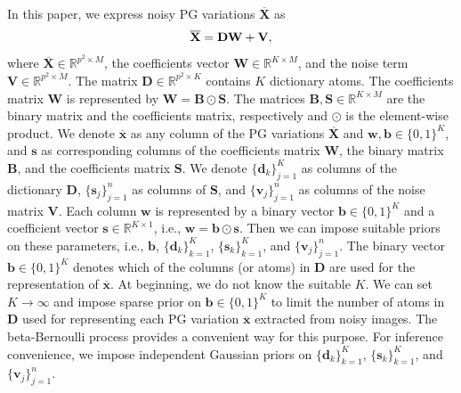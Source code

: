 \documentclass[runningheads]{llncs}
\begin{document}
In this paper, we express noisy PG variations $\mathbf{\overline{X}}$ as\vspace{-0.1in}
\begin{equation}\label{equ7}
\mathbf{\overline{X}} = \mathbf{D}\mathbf{W}+\mathbf{V},\vspace{-0.1in}
\end{equation}
where $\mathbf{\overline{X}}\in\mathbb{R}^{p^2\times M}$, the coefficients vector 
$\mathbf{W}\in\mathbb{R}^{K\times M}$, and the noise term $\mathbf{V} \in \mathbb{R}^{p^2\times M}$. The matrix $\mathbf{D}\in \mathbb{R}^{p^2\times K}$ contains $K$ dictionary atoms. The coefficients matrix $\mathbf{W}$ is represented by $\mathbf{W} = \mathbf{B}\odot\mathbf{S}$. The matrices $\mathbf{B}, \mathbf{S}\in\mathbb{R}^{K\times M}$ are the binary matrix and the coefficients matrix, respectively and $\odot$ is the element-wise product. We denote $\mathbf{\overline{x}}$ as any column of the PG variations $\mathbf{\overline{X}}$ and $\mathbf{w}, \mathbf{b}\in\{0,1\}^{K}$, and $\mathbf{s}$ as corresponding columns of the coefficients matrix $\mathbf{W}$, the binary matrix $\mathbf{B}$, and the coefficients matrix $\mathbf{S}$. We denote $\{\mathbf{d}_{k}\}_{j=1}^{K}$ as columns of the dictionary $\mathbf{D}$, $\{\mathbf{s}_{j}\}_{j=1}^{n}$ as columns of $\mathbf{S}$, and $\{\mathbf{v}_{j}\}_{j=1}^{n}$ as columns of the noise matrix $\mathbf{V}$. Each column $\mathbf{w}$ is represented by a binary vector $\mathbf{b}\in\{0,1\}^{K}$ and a coefficient vector $\mathbf{s}\in\mathbb{R}^{K\times 1}$, i.e., $\mathbf{w} = \mathbf{b}\odot\mathbf{s}$. Then we can impose suitable priors on these parameters, i.e., $\mathbf{b}$, $\{\mathbf{d}_{k}\}_{k=1}^{K}$, $\{\mathbf{s}_{k}\}_{k=1}^{K}$, and $\{\mathbf{v}_{j}\}_{j=1}^{n}$. The binary vector $\mathbf{b}\in\{0,1\}^{K}$ denotes which of the columns (or atoms) in $\mathbf{D}$ are used for the representation of $\mathbf{\overline{x}}$. At beginning, we do not know the suitable $K$. We can set $K \rightarrow \infty$ and impose sparse prior on $\mathbf{b}\in\{0,1\}^{K}$ to limit the number of atoms in $\mathbf{D}$ used for representing each PG variation $\mathbf{\overline{x}}$ extracted from noisy images. The beta-Bernoulli process \cite{hjort1990,thibaux2007,paisley2009} provides a convenient way for this purpose. For inference convenience, we impose independent Gaussian priors on $\{\mathbf{d}_{k}\}_{k=1}^{K}$, $\{\mathbf{s}_{k}\}_{k=1}^{K}$, and $\{\mathbf{v}_{j}\}_{j=1}^{n}$.
\end{document}
